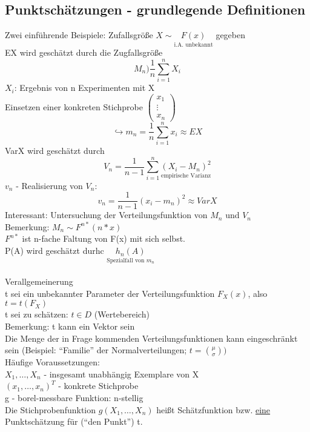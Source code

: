 \documentclass[a4paper,12pt]{scrartcl}
\begin{document}
  \subsection{Punktschätzungen - grundlegende Definitionen}
  Zwei einführende Beispiele: Zufallsgröße $X \sim \underset{\text{i.A. unbekannt}}{F(x)}$ gegeben\\
  EX wird geschätzt durch die Zugfallsgröße
  $$M_n ) \frac{1}{n}\sum_{i=1}^n X_i $$
  $X_i$: Ergebnis von n Experimenten mit X\\
  Einsetzen einer konkreten Stichprobe 
  $\begin{pmatrix}
    x_1\\
  \vdots\\
  x_n
   \end{pmatrix}$\\
  $$\hookrightarrow m_n = \frac{1}{n} \sum_{i=1}^n x_i \approx EX$$
  VarX wird geschätzt durch
  $$V_n = \frac{1}{n-1}\sum_{i=1}^n \underset{\text{empirische Varianz}}{(X_i -M_n)^2} $$
  $v_n$ - Realisierung von $V_n$:
  $$v_n = \frac{1}{n-1}(x_i-m_n)^2 \approx VarX $$
  Interessant: Untersuchung der Verteilungsfunktion von $M_n$ und $V_n$\\
  Bemerkung: $M_n\sim F^{n*}(n*x)$\\
  $F^{n*}$ ist n-fache Faltung von F(x) mit sich selbst.\\
  P(A) wird geschätzt durhc $\underset{\text{Spezialfall von $m_n$}}{h_n(A)}$\\
  \\
  Verallgemeinerung\\
  t sei ein unbekannter Parameter der Verteilungsfunktion $F_X(x)$, also $t=t(F_X)$\\
  t sei zu schätzen: $t\in D$ (Wertebereich)\\
  Bemerkung: t kann ein Vektor sein\\
  Die Menge der in Frage kommenden Verteilungsfunktionen kann eingeschränkt sein (Beispiel: "`Familie"' der Normalverteilungen; $t=\binom{\mu}{\sigma})$\\
  Häufige Voraussetzungen:\\
  $X_1,\dots,X_n$ - insgesamt unabhängig Exemplare von X\\
  $(x_1,\dots,x_n)^T$ - konkrete Stichprobe\\
  g - borel-messbare Funktion: n-stellig\\
  Die Stichprobenfunktion $g(X_1,\dots,X_n)$ heißt Schätzfunktion bzw. \underline{eine} Punktschätzung für ("`den Punkt"') t.\\
\end{document}
